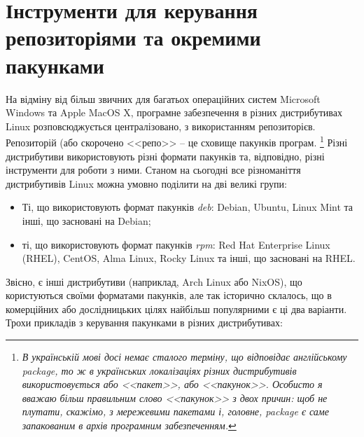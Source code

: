 \documentclass[10pt,a4paper]{fancyhandout}
\begin{document}
\section{Інструменти для керування репозиторіями та окремими пакунками}
На відміну від більш звичних для багатьох операційних систем Microsoft Windows та Apple MacOS X, програмне забезпечення в різних дистрибутивах Linux розповсюджується централізовано, з використанням репозиторієв. Репозиторій (або скорочено <<репо>> -- це сховище пакунків програм.
\footnote{\textit{В українській мові досі немає сталого терміну, що відповідає англійському package, то ж в українських локалізаціях різних дистрибутивів використовується або <<пакет>>, або <<пакунок>>. Особисто я вважаю більш правильним слово <<пакунок>> з двох причин: щоб не плутати, скажімо, з мережевими пакетами і, головне, package є саме запакованим в архів програмним забезпеченням.}}
Різні дистрибутиви використовують різні формати пакунків та, відповідно, різні інструменти для роботи з ними. Станом на сьогодні все різноманіття дистрибутивів Linux можна умовно поділити на дві великі групи:
\begin{itemize}
	\item Ті, що використовують формат пакунків \textit{deb}: Debian, Ubuntu, Linux Mint та інші, що засновані на Debian;
	\item ті, що використовують формат пакунків \textit{rpm}: Red Hat Enterprise Linux (RHEL), CentOS, Alma Linux, Rocky Linux та інші, що засновані на RHEL.
\end{itemize}
Звісно, є інші дистрибутиви (наприклад, Arch Linux або NixOS), що користуються своїми форматами пакунків, але так історично склалось, що в комерційних або дослідницьких цілях найбільш популярними є ці два варіанти. \\
Трохи прикладів з керування пакунками в різних дистрибутивах: \\
\end{document}
